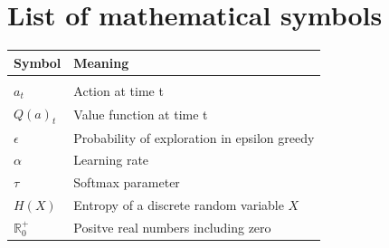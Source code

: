 \documentclass[12pt,a4paper,bibliography=totocnumbered,listof=totocnumbered]{scrartcl}
\begin{document}
\setcounter{page}{1}


	\tableofcontents


\pagebreak


	\listoffigures
	
	
\pagebreak


	\listoftables
	

\pagebreak

\renewcommand{\lstlistlistingname}{List of Listings}
{\lstlistoflistings}
\pagebreak


\renewcommand{\arraystretch}{1.5}	
\section{List of mathematical symbols}

\begin{tabular}{p{6cm}p{9cm}}
\textbf{Symbol} 		& 		\textbf{Meaning} \\
\midrule
\vspace{0.3cm} & \vspace{0.3cm} 			\\
$a_t$				  & Action at time t			\\
$Q(a)_t$	& Value function at time t \\
$\epsilon$			& Probability of exploration in epsilon greedy \\
$\alpha$ & Learning rate \\ 
$\tau$ & Softmax parameter \\
$H(X) $ &  Entropy of a  discrete random variable $X$ \\ 
$ \mathbb{R}_0^+$ & Positve real numbers including zero 
\end{tabular}
\end{document}
